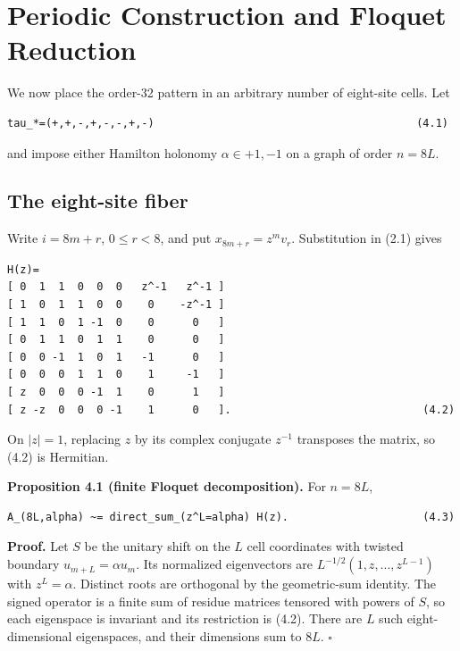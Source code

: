\section{Periodic Construction and Floquet Reduction}

We now place the order-32 pattern in an arbitrary number of eight-site cells.
Let

\begin{lstlisting}[language={}]
tau_*=(+,+,-,+,-,-,+,-)                                         (4.1)
\end{lstlisting}

and impose either Hamilton holonomy \(\alpha \in {+1,-1}\) on a graph of order
\(n=8L\).

\subsection{The eight-site fiber}

Write \(i=8m+r\), \(0\le r<8\), and put \(x_{8m+r}=z^m v_r\). Substitution in (2.1)
gives

\begin{lstlisting}[language={}]
H(z)=
[ 0  1  1  0  0  0   z^-1   z^-1 ]
[ 1  0  1  1  0  0    0    -z^-1 ]
[ 1  1  0  1 -1  0    0      0   ]
[ 0  1  1  0  1  1    0      0   ]
[ 0  0 -1  1  0  1   -1      0   ]
[ 0  0  0  1  1  0    1     -1   ]
[ z  0  0  0 -1  1    0      1   ]
[ z -z  0  0  0 -1    1      0   ].                              (4.2)
\end{lstlisting}

On \(|z|=1\), replacing \(z\) by its complex conjugate \(z^{-1}\) transposes the
matrix, so (4.2) is Hermitian.

\textbf{Proposition 4.1 (finite Floquet decomposition).} For \(n=8L\),

\begin{lstlisting}[language={}]
A_(8L,alpha) ~= direct_sum_(z^L=alpha) H(z).                     (4.3)
\end{lstlisting}

\textbf{Proof.} Let \(S\) be the unitary shift on the \(L\) cell coordinates with
twisted boundary \(u_{m+L}=\alpha u_m\). Its normalized eigenvectors are
\(L^{-1/2}(1,z,...,z^{L-1})\) with \(z^L=\alpha\). Distinct roots are orthogonal by
the geometric-sum identity. The signed operator is a finite sum of residue
matrices tensored with powers of \(S\), so each eigenspace is invariant and its
restriction is (4.2). There are \(L\) such eight-dimensional eigenspaces, and
their dimensions sum to \(8L\). \(\square\)

